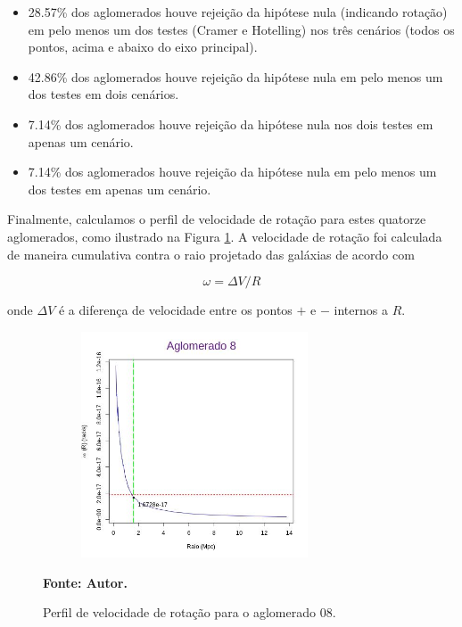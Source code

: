 \begin{itemize}
   	\item 28.57\% dos aglomerados houve rejeição da hipótese nula (indicando rotação) em pelo menos um dos testes (Cramer e Hotelling) nos três cenários (todos os pontos, acima e abaixo do eixo principal). 
   	\item 42.86\% dos aglomerados houve rejeição da hipótese nula em pelo menos um dos testes em dois cenários.
   	\item 7.14\% dos aglomerados houve rejeição da hipótese nula nos dois testes em apenas um cenário.
   	\item 7.14\% dos aglomerados houve rejeição da hipótese nula em pelo menos um dos testes em apenas um cenário.
 \end{itemize} 

Finalmente, calculamos o perfil de velocidade de rotação para estes quatorze aglomerados, como ilustrado na Figura \ref{selec20rotacao}. A velocidade de rotação foi calculada de maneira cumulativa contra o raio projetado das galáxias de acordo com

\begin{equation}
\omega= \Delta V/R
\label{eq:eq10}
\end{equation}

\noindent onde $\Delta V$ é a diferença de velocidade entre os pontos $+$ e $-$ internos a $R$.

\begin{figure}[H] %
\vspace{-2pt}
\begin{center}
\includegraphics[height=6.7cm,width=9cm]{04-figuras/selec20rotacao}%
\caption{Perfil de velocidade de rotação para o aglomerado 08.}
\textbf{Fonte: Autor.}
\label{selec20rotacao}%
\end{center}
\end{figure}

